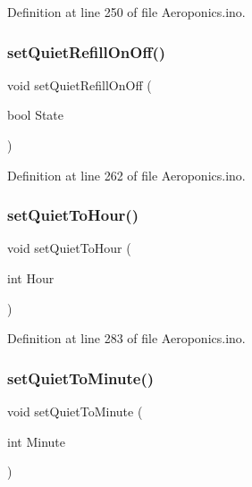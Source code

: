 Definition at line 250 of file Aeroponics.\+ino.

\mbox{\label{_aeroponics_8ino_a0cd33e49bb5cbaf7ad545d3b1d65283b}} 
\subsubsection{\texorpdfstring{setQuietRefillOnOff()}{setQuietRefillOnOff()}}
{\footnotesize\ttfamily void set\+Quiet\+Refill\+On\+Off (\begin{DoxyParamCaption}\item[{bool}]{State }\end{DoxyParamCaption})}



Definition at line 262 of file Aeroponics.\+ino.

\mbox{\label{_aeroponics_8ino_af9578971f972999d11f358bc11eee209}} 
\subsubsection{\texorpdfstring{setQuietToHour()}{setQuietToHour()}}
{\footnotesize\ttfamily void set\+Quiet\+To\+Hour (\begin{DoxyParamCaption}\item[{int}]{Hour }\end{DoxyParamCaption})}



Definition at line 283 of file Aeroponics.\+ino.

\mbox{\label{_aeroponics_8ino_a156a9004b503cc67faa39b569f43f189}} 
\subsubsection{\texorpdfstring{setQuietToMinute()}{setQuietToMinute()}}
{\footnotesize\ttfamily void set\+Quiet\+To\+Minute (\begin{DoxyParamCaption}\item[{int}]{Minute }\end{DoxyParamCaption})}



